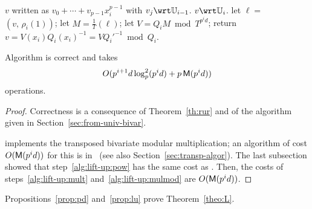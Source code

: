 \begin{algorithm}
  \caption{}
  \label{alg:liftup}
  \begin{algorithmic}[1]
    \REQUIRE $v$ written as $v_0+\cdots+v_{p-1}x_i^{p-1}$ with $v_j \wrt \U_{i-1}$.
    \ENSURE $v\wrt \U_i$.
    \STATE \label{alg:lift-up:transmul} let $\ell =$ $(v,\,\rho_i(1))$;
    \STATE \label{alg:lift-up:pow} let $M=\frac{1}{T}$$(\ell)$;
    \STATE \label{alg:lift-up:mult} let $V = Q_iM \bmod T^{p^id}$;
    \STATE \label{alg:lift-up:mulmod} return $v=V(x_i)Q_i(x_i)^{-1} = V {Q_i'}^{-1} \bmod Q_i$.
  \end{algorithmic}
\end{algorithm}

\begin{proposition}\label{prop:lu}
  Algorithm  is correct and takes 
  \begin{equation}
    \label{eq:85}
    O(p^{i+1}d\log_p^2(p^id)+p\,\mathsf{M}(p^{i}d))
  \end{equation}
  operations.
\end{proposition}
\begin{proof}
  Correctness is a consequence of Theorem~\ref{th:rur} and of the
  algorithm given in Section~\ref{sec:from-univ-bivar}.

   implements the
  transposed bivariate
  modular multiplication; an algorithm of cost $O(\mathsf{M}(p^id))$ for
  this is in~\cite[Corollary~2]{pascal+schost06} (see also
  Section~\ref{sec:transp-algor}).  The last subsection showed that
  step~\ref{alg:lift-up:pow} has the same cost as
  . Then, the costs of
  steps~\ref{alg:lift-up:mult} and~\ref{alg:lift-up:mulmod} are
  $O(\mathsf{M}(p^id))$.
\end{proof}

Propositions~\ref{prop:pd} and~\ref{prop:lu} prove
Theorem~\ref{theo:L}.


